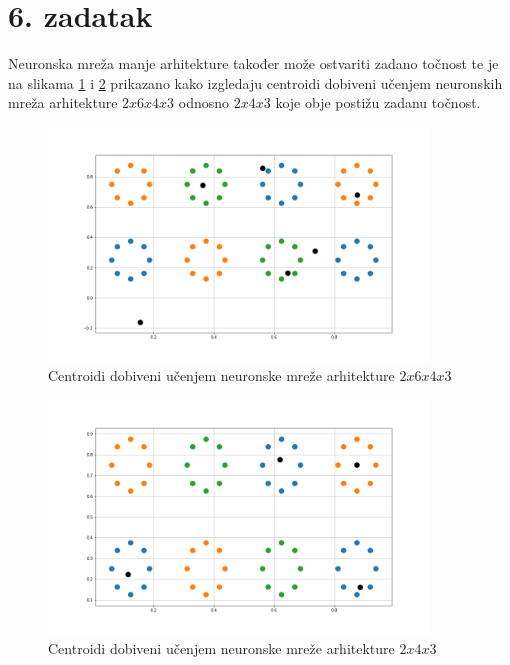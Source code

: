 \documentclass[12pt, a4paper, numeric]{article}
\begin{document}
\section*{6. zadatak}
Neuronska mreža manje arhitekture također može ostvariti zadano točnost te je na slikama \ref{fig:zad6a} i \ref{fig:zad6b} prikazano kako izgledaju centroidi dobiveni učenjem neuronskih mreža arhitekture $2x6x4x3$ odnosno $2x4x3$ koje obje postižu zadanu točnost. 
\begin{figure}[ht!] 
    \centering
    \includegraphics[width=0.9\textwidth]{img/zadatak6}
    \captionsetup{justification=centering}
    \caption{Centroidi dobiveni učenjem neuronske mreže arhitekture $2x6x4x3$}
    \label{fig:zad6a}
\end{figure}
\begin{figure}[ht!] 
    \centering
    \includegraphics[width=0.9\textwidth]{img/2x4x3}
    \captionsetup{justification=centering}
    \caption{Centroidi dobiveni učenjem neuronske mreže arhitekture $2x4x3$}
    \label{fig:zad6b}
\end{figure}
\pagebreak
\end{document}
